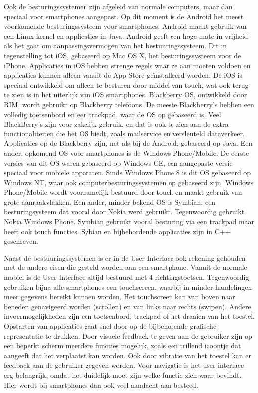 Ook de besturingssystemen zijn afgeleid van normale computers, maar dan speciaal voor smartphones aangepast.
Op dit moment is de Android het meest voorkomende besturingssysteem voor smartphones.
Android maakt gebruik van een Linux kernel en applicaties in Java.
Android geeft een hoge mate in vrijheid als het gaat om aanpassingsvermogen van het bestuuringssysteem.
Dit in tegenstelling tot iOS, gebaseerd op Mac OS X, het besturingssysteem voor de iPhone.
Applicaties in iOS hebben strenge regels waar ze aan moeten voldoen en applicaties kunnen alleen vanuit de App Store ge\"installeerd worden.
De iOS is speciaal ontwikkeld om alleen te besturen door middel van touch, wat ook terug te zien is in het uiterlijk van iOS smartphones.
Blackberry OS, ontwikkeld door RIM, wordt gebruikt op Blackberry telefoons.
De meeste Blackberry's hebben een volledig toetsenbord en een trackpad, waar de OS op gebaseerd is.
Veel BlackBerry's zijn voor zakelijk gebruik, en dat is ook te zien aan de extra functionaliteiten die het OS biedt, zoals mailservice en versleuteld dataverkeer.
Applicaties op de Blackberry zijn, net als bij de Android, gebaseerd op Java.
Een ander, opkomend OS voor smartphones is de Windows Phone/Mobile.
De eerste versies van dit OS waren gebaseerd op Windows CE, een aangepaste versie speciaal voor mobiele apparaten.
Sinds Windows Phone 8 is dit OS gebaseerd op Windows NT, waar ook computerbesturingssystemen op gebaseerd zijn.
Windows Phone/Mobile wordt voornamelijk bestuurd door touch en maakt gebruik van grote aanraakvlakken.
Een ander, minder bekend OS is Symbian, een besturingsysteem dat vooral door Nokia werd gebruikt.
Tegenwoordig gebruikt Nokia Windows Phone.
Symbian gebruikt vooral besturing via een trackpad maar heeft ook touch functies.
Sybian en bijbehordende applicaties zijn in C++ geschreven.

Naast de bestuuringssystemen is er in de User Interface ook rekening gehouden met de andere eisen die gesteld worden aan een smartphone.
Vanuit de normale mobiel is de User Interface altijd bestuurd met 4 richtingstoetsen.
Tegenwoordig gebruiken bijna alle smartphones een touch\-screen, waarbij in minder handelingen meer gegevens bereikt kunnen worden.
Het touchscreen kan van boven naar beneden genavigeerd worden (scrollen) en van links naar rechts (swipen).
Andere invoermogelijkheden zijn een toetsenbord, trackpad of het draaien van het toestel.
Opstarten van applicaties gaat snel door op de bijbehorende grafische representatie te drukken.
Door visuele feedback te geven aan de gebruiker zijn op een beperkt scherm meerdere functies mogelijk, zoals een trillend icoontje dat aangeeft dat het verplaatst kan worden.
Ook door vibratie van het toestel kan er feedback aan de gebruiker gegeven worden.
Voor navigatie is het user interface erg belangrijk, omdat het duidelijk moet zijn welke functie zich waar bevindt.
Hier wordt bij smartphones dan ook veel aandacht aan besteed.


